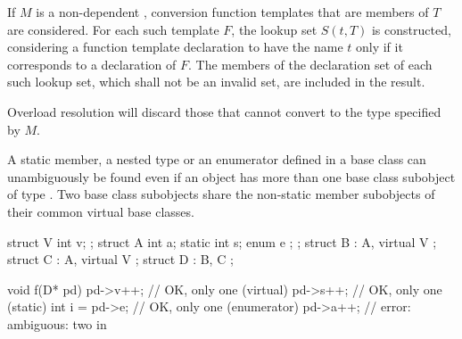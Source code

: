 \pnum
If $M$ is a non-dependent ,
conversion function templates that are members of $T$ are considered.
For each such template $F$, the lookup set $S(t,T)$ is constructed,
considering a function template declaration to have the name $t$
only if it corresponds to a declaration of $F$.
The members of the declaration set of each such lookup set,
which shall not be an invalid set, are included in the result.
\begin{note}
Overload resolution will discard those
that cannot convert to the type specified by $M$.
\end{note}

\pnum
\begin{note}
A static member, a nested type or an enumerator defined in a base class
 can unambiguously be found even if an object has more than one
base class subobject of type . Two base class subobjects share
the non-static member subobjects of their common virtual base classes.
\end{note}
\begin{example}
\begin{codeblock}
struct V {
  int v;
};
struct A {
  int a;
  static int s;
  enum { e };
};
struct B : A, virtual V { };
struct C : A, virtual V { };
struct D : B, C { };

void f(D* pd) {
  pd->v++;          // OK, only one  (virtual)
  pd->s++;          // OK, only one  (static)
  int i = pd->e;    // OK, only one  (enumerator)
  pd->a++;          // error: ambiguous: two  in 
}
\end{codeblock}
\end{example}

